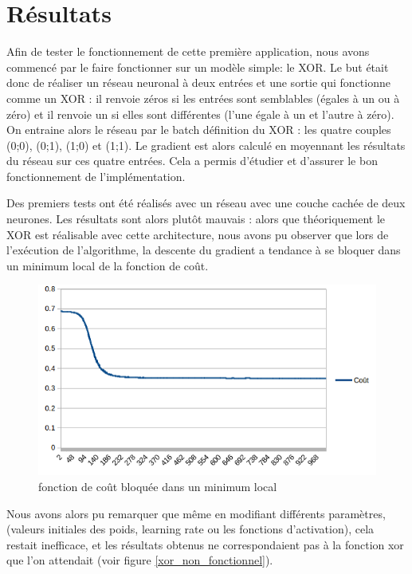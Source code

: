 \documentclass{report}
\begin{document}
\section{Résultats}

Afin de tester le fonctionnement de cette première application, nous avons commencé par le faire fonctionner sur un modèle simple: le XOR. Le but était donc de réaliser un réseau neuronal à deux entrées et une sortie qui fonctionne comme un XOR : il renvoie zéros si les entrées sont semblables (égales à un ou à zéro) et il renvoie un si elles sont différentes (l'une égale à un et l'autre à zéro). On entraine alors le réseau par le batch définition du XOR : les quatre couples (0;0), (0;1), (1;0) et (1;1). Le gradient est alors calculé en moyennant les résultats du réseau sur ces quatre entrées.
Cela a permis d'étudier et d'assurer le bon fonctionnement de l'implémentation.

Des premiers tests ont été réalisés avec un réseau avec une couche cachée de deux neurones. Les résultats sont alors plutôt mauvais : alors que théoriquement le XOR est réalisable avec cette architecture, nous avons pu observer que lors de l'exécution de l'algorithme, la descente du gradient a tendance à se bloquer dans un minimum local de la fonction de coût. 

\begin{figure}[!h]
\begin{center}
\includegraphics[scale=0.6]{images/xor_cost_function.png}
\caption{fonction de coût bloquée dans un minimum local}
\label{xor_cout_bloque}
\end{center}
\end{figure}

Nous avons alors pu remarquer que même en modifiant différents paramètres, (valeurs initiales des poids, learning rate ou les fonctions d'activation), cela restait inefficace, et les résultats obtenus ne correspondaient pas à la fonction xor que l'on attendait (voir figure \ref{xor_non_fonctionnel}).
\end{document}

